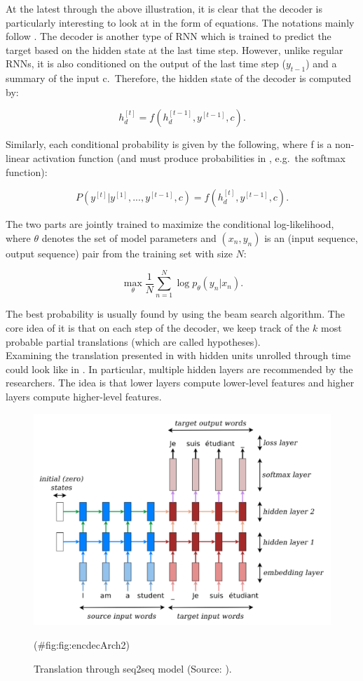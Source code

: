 \documentclass[
]{krantz}
\begin{document}
At the latest through the above illustration, it is clear that the
decoder is particularly interesting to look at in the form of equations.
The notations mainly follow \citep{Cho2014}. The decoder is another type of
RNN which is trained to predict the target based on the hidden state at
the last time step. However, unlike regular RNNs, it is also conditioned
on the output of the last time step (\(y_{t-1}\)) and a summary of the
input c.~Therefore, the hidden state of the decoder is computed by:

\[h_d^{[t]} = f(h_d^{[t-1]},y^{[t-1]},c).
    \label{eqn:h_dec}\]

Similarly, each conditional probability is given by the following, where
f is a non-linear activation function (and must produce probabilities in
, e.g.~the softmax function):

\[P(y^{[t]}|y^{[1]},...,y^{[t-1]},c) = f(h_d^{[t]}, y^{[t-1]}, c).     \label{eqn:P_dec}\]

The two parts are jointly trained to maximize the conditional
log-likelihood, where \(\theta\) denotes the set of model parameters and
\((x_n, y_n)\) is an (input sequence, output sequence) pair from the
training set with size \(N\):

\[\max_\theta \frac{1}{N} \displaystyle \sum_{n=1}^{N} \log p_{\theta}(y_n|x_n).
    \label{eqn:train_dec}\]

The best probability is usually found by using the beam search
algorithm. The core idea of it is that on each step of the decoder, we
keep track of the \(k\) most probable partial translations (which are
called hypotheses).\\
Examining the translation presented in with hidden units unrolled
through time could look like in . In particular, multiple hidden layers
are recommended by the researchers. The idea is that lower layers
compute lower-level features and higher layers compute higher-level
features.

\begin{figure}

{\centering \includegraphics[width=0.7\linewidth]{./figures/01-01-nlp/encdec_arch2_deepl} 

}

\caption{Translation through seq2seq model (Source: \citet{Manning2022}).}(\#fig:fig:encdecArch2)
\end{figure}
\end{document}
